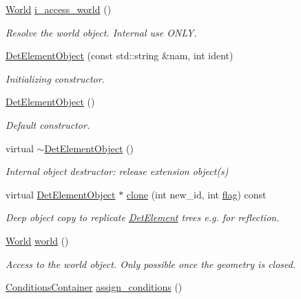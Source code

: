 \begin{DoxyCompactItemize}
\item 
\hyperlink{class_d_d4hep_1_1_geometry_1_1_world}{World} \hyperlink{class_d_d4hep_1_1_geometry_1_1_det_element_object_af8e12445511be14deaedd157bd8ddbd6}{i\+\_\+access\+\_\+world} ()
\begin{DoxyCompactList}\small\item\em Resolve the world object. Internal use O\+N\+LY. \end{DoxyCompactList}\item 
\hyperlink{class_d_d4hep_1_1_geometry_1_1_det_element_object_a2001d9608badcd67be58cdf9e8092ee8}{Det\+Element\+Object} (const std\+::string \&nam, int ident)
\begin{DoxyCompactList}\small\item\em Initializing constructor. \end{DoxyCompactList}\item 
\hyperlink{class_d_d4hep_1_1_geometry_1_1_det_element_object_ab96898101ad9db1eb508106a0b6bd6ab}{Det\+Element\+Object} ()
\begin{DoxyCompactList}\small\item\em Default constructor. \end{DoxyCompactList}\item 
virtual \hyperlink{class_d_d4hep_1_1_geometry_1_1_det_element_object_a96c026595b89aa43a03d2406c52a778d}{$\sim$\+Det\+Element\+Object} ()
\begin{DoxyCompactList}\small\item\em Internal object destructor\+: release extension object(s) \end{DoxyCompactList}\item 
virtual \hyperlink{class_d_d4hep_1_1_geometry_1_1_det_element_object}{Det\+Element\+Object} $\ast$ \hyperlink{class_d_d4hep_1_1_geometry_1_1_det_element_object_aaf736c420acd42e2f8def1c9344709d6}{clone} (int new\+\_\+id, int \hyperlink{class_d_d4hep_1_1_geometry_1_1_det_element_object_abcab90748d7423310fbf73fcc54cef47}{flag}) const
\begin{DoxyCompactList}\small\item\em Deep object copy to replicate \hyperlink{class_d_d4hep_1_1_geometry_1_1_det_element}{Det\+Element} trees e.\+g. for reflection. \end{DoxyCompactList}\item 
\hyperlink{class_d_d4hep_1_1_geometry_1_1_world}{World} \hyperlink{class_d_d4hep_1_1_geometry_1_1_det_element_object_aab07042df4ed702bedeb898bf17c180f}{world} ()
\begin{DoxyCompactList}\small\item\em Access to the world object. Only possible once the geometry is closed. \end{DoxyCompactList}\item 
\hyperlink{class_d_d4hep_1_1_geometry_1_1_det_element_object_a01728952c7dd2f2c102e2a1ae25b80ff}{Conditions\+Container} \hyperlink{class_d_d4hep_1_1_geometry_1_1_det_element_object_af14fab1a6caabaad84336f6312ae5617}{assign\+\_\+conditions} ()
\end{DoxyCompactItemize}
